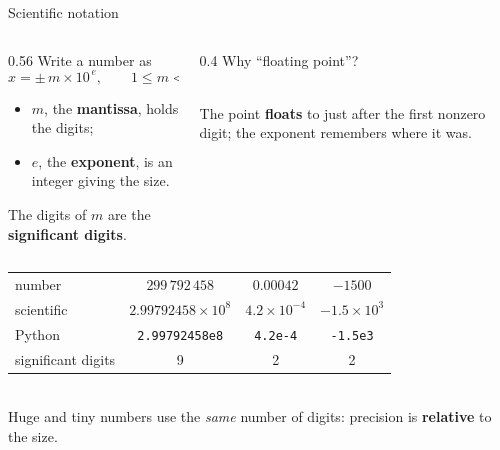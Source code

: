 \documentclass[aspectratio=169]{beamer}
\begin{document}
\begin{frame}{Scientific notation}
\begin{columns}[T]
\begin{column}{0.56\textwidth}
\small
Write a number as
\[
x = \pm\, m \times 10^{\,e}, \qquad 1 \le m < 10
\]
\begin{itemize}
  \item $m$, the \textbf{mantissa}, holds the digits;
  \item $e$, the \textbf{exponent}, is an integer giving the size.
\end{itemize}
The digits of $m$ are the \textbf{significant digits}.
\end{column}
\begin{column}{0.4\textwidth}
\centering
\small Why ``floating point''?\\[4pt]
\\[4pt]
\scriptsize The point \textbf{floats} to just after the first nonzero digit; the exponent remembers where it was.
\end{column}
\end{columns}
\vspace{0.3cm}
\centering
\small
\begin{tabular}{lccc}
\toprule
number & $299\,792\,458$ & $0.00042$ & $-1500$ \\
scientific & $2.99792458 \times 10^{8}$ & $4.2 \times 10^{-4}$ & $-1.5 \times 10^{3}$ \\
Python & \texttt{2.99792458e8} & \texttt{4.2e-4} & \texttt{-1.5e3} \\
significant digits & 9 & 2 & 2 \\
\bottomrule
\end{tabular}\\[6pt]
\scriptsize Huge and tiny numbers use the \emph{same} number of digits: precision is \textbf{relative} to the size.
\end{frame}
\end{document}

